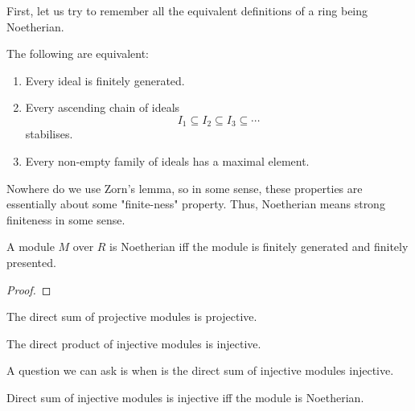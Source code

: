 \documentclass[oneside, 12pt, ]{scrbook}
\theoremstyle{theorem}
\begin{document}
First, let us try to remember all the equivalent definitions of a ring being Noetherian. 

\begin{proposition}
The following are equivalent:
\begin{enumerate}
\item Every ideal is finitely generated. 
\item Every ascending chain of ideals $$I_{1} \subseteq I_{2} \subseteq I_{3} \subseteq \cdots $$ stabilises. 
\item Every non-empty family of ideals has a maximal element. 
\end{enumerate}
\end{proposition}

Nowhere do we use Zorn's lemma, so in some sense, these properties are essentially about some "finite-ness" property. Thus, Noetherian means strong finiteness in some sense. 

\begin{definition}

\end{definition}

\begin{definition}

\end{definition}

\begin{theorem}
A module $M$ over $R$ is Noetherian iff the module is finitely generated and finitely presented. 
\end{theorem}

\begin{proof}

\end{proof}

\begin{proposition}
The direct sum of projective modules is projective. 
\end{proposition}

\begin{proposition}
The direct product of injective modules is injective.
\end{proposition}

A question we can ask is when is the direct sum of injective modules injective. 

\begin{proposition}
Direct sum of injective modules is injective iff the module is Noetherian.
\end{proposition}
\end{document}
